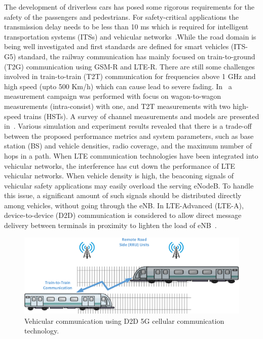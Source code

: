 The development of driverless cars has posed some rigorous requirements for the safety of the passengers and pedestrians. For safety-critical applications the transmission delay needs to be less than 10 ms which is required for intelligent transportation systems (ITSs) and vehicular networks~\cite{ge2016vehicular}.While the road domain is being well investigated and first standards are defined for smart vehicles (ITS-G5) standard, the railway communication has mainly focused on train-to-ground (T2G) communication using GSM-R and LTE-R. There are still some challenges involved in train-to-train (T2T) communication for frequencies above 1 GHz and high speed (upto 500 Km/h) which can cause lead to severe fading. In~\cite{nterhuber2017wide} a measurement campaign was performed with focus on wagon-to-wagon measurements (intra-consist) with one, and T2T measurements with two high-speed trains (HSTs). A survey of channel measurements and models are presented in~\cite{unterhuber2016survey}. Various simulation and experiment results revealed that there is a trade-off between the proposed performance metrics and system parameters, such as base station (BS) and vehicle densities, radio coverage, and  the  maximum number of hops in a path. When LTE communication technologies have been integrated into vehicular networks, the interference has cut down the performance of LTE vehicular networks. When vehicle density is high, the beaconing signals of vehicular safety applications may easily overload the serving eNodeB. To handle this issue, a significant amount of such signals should be distributed directly among vehicles, without  going  through  the  eNB. In  LTE-Advanced (LTE-A), device-to-device (D2D) communication is considered to allow direct message delivery between terminals in proximity to lighten the load of eNB~\cite{mumtaz2014direct}. 

\begin{figure}[!ht]
	\centering
\includegraphics[width=\textwidth,keepaspectratio]{images/Gill/5G/vehiclecomm.eps}
	\caption{Vehicular communication using D2D 5G cellular communication technology.}
	\label{vcomm}
\end{figure}

